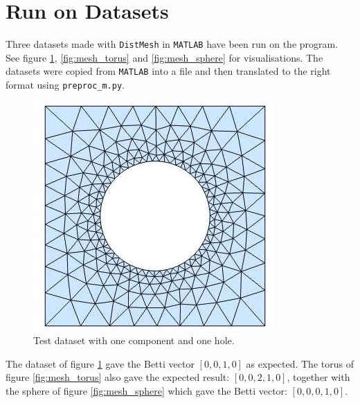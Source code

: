 \documentclass[11pt,a4paper,twoside]{report}
\begin{document}
\section{Run on Datasets}\label{ch:test_data}
Three datasets made with \texttt{DistMesh} in \texttt{MATLAB} have been run on the program. See figure \ref{fig:mesh_oneHole}, \ref{fig:mesh_torus} and \ref{fig:mesh_sphere} for visualisations. The datasets were copied from \texttt{MATLAB} into a file and then translated to the right format using \texttt{preproc\_m.py}. 
\begin{figure}[H]
\center
\includegraphics[scale=0.5]{oneComponentOneHole.jpg}
\caption{Test dataset with one component and one hole.}
\label{fig:mesh_oneHole}
\end{figure}
The dataset of figure \ref{fig:mesh_oneHole} gave the Betti vector $[0,0,1,0]$ as expected. The torus of figure \ref{fig:mesh_torus} also gave the expected result: $[0,0,2,1,0]$, together with the sphere of figure \ref{fig:mesh_sphere} which gave the Betti vector: $[0,0,0,1,0]$.
\end{document}
